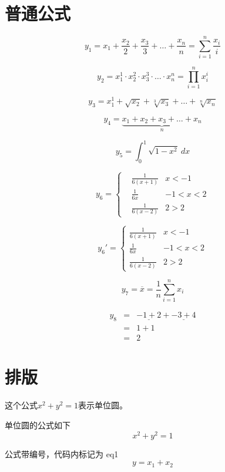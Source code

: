 \documentclass[UTF8]{ctexart}
\begin{document}
\tableofcontents

\newpage

\section{普通公式}

$$y_1 = x_1 + \frac{x_2}{2} + \frac{x_3}{3} + \dots + \frac{x_n}{n} = \sum_{i=1}^n \frac{x_i}{i}$$

$$y_2 = x_1^1 \cdot x_2^2 \cdot x_3^3 \cdot \dots \cdot x_n^n = \prod_{i=1}^n x_i^i$$

$$y_3 = x_1^1 + \sqrt{x_2} + \sqrt[3]{x_3} + \dots + \sqrt[n]{x_n} $$

$$y_4 = \underbrace{x_1 + x_2 + x_3 + \dots + x_n}_{n}$$

$$y_5 = \int_{0}^{1} \sqrt{1-x^2}\ dx$$

$$
y_6 = \left\{
\begin{aligned}
&\frac{1}{6(x+1)} & x < -1\\
&\frac{1}{6x}  & -1 < x < 2\\
&\frac{1}{6(x-2)} & 2 > 2
\end{aligned}
\right.
$$

$$
y_6'= \left\{
\begin{array}{cc}
\frac{1}{6(x+1)} & x < -1\\
\frac{1}{6x}  & -1 < x < 2\\
\frac{1}{6(x-2)} & 2 > 2
\end{array}
\right.
$$

$$
y_7 = \overline{x} = \frac{1}{n}\sum_{i=1}^n x_i
$$

\begin{eqnarray*}
y_8 & = & \underline{-1 + 2} + \underline{-3 + 4} \\
\ & = & 1 + 1 \\
\ & = & 2
\end{eqnarray*}

\newpage

\section{排版}

这个公式$x^2+y^2=1$表示单位圆。\par
单位圆的公式如下
$$x^2+y^2=1$$\par

公式带编号，代码内标记为 eq1
\begin{equation}\label{eq1}
y = x_1 + x_2
\end{equation}\par
\end{document}
